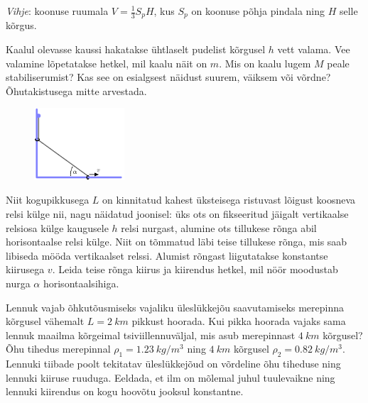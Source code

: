 \documentclass[10pt]{article}
\begin{document}
\textit{Vihje}: koonuse ruumala $V=\frac{1}{3}S_p H$, kus $S_p$ on koonuse põhja pindala ning $H$ selle kõrgus.
\probend
\bigskip


Kaalul olevasse kaussi hakatakse ühtlaselt pudelist kõrgusel $h$ vett valama. Vee valamine lõpetatakse hetkel, mil kaalu näit on $m$. Mis on kaalu lugem $M$ peale stabiliserumist? Kas see on esialgsest näidust suurem, väiksem või võrdne? Õhutakistusega mitte arvestada.
\probend
\bigskip


\begin{figure}
	\vspace{-13pt}
	\includegraphics[width=0.3\textwidth]{2019-lahg-07-yl.pdf}
\end{figure}

Niit kogupikkusega $L$ on kinnitatud kahest üksteisega ristuvast lõigust koosneva relsi külge nii, nagu näidatud joonisel: üks ots on fikseeritud jäigalt vertikaalse relsiosa külge kaugusele $h$ relsi nurgast, alumine ots tillukese rõnga abil horisontaalse relsi külge. Niit on tõmmatud läbi teise tillukese rõnga, mis saab libiseda mööda vertikaalset relssi. Alumist rõngast liigutatakse konstantse kiirusega $v$. Leida teise rõnga kiirus ja kiirendus hetkel, mil nöör moodustab nurga $\alpha$ horisontaalsihiga.
\probend
\bigskip

\setAuthor{}

Lennuk vajab õhkutõusmiseks vajaliku üleslükkejõu saavutamiseks merepinna kõrgusel vähemalt $L=\SI{2}{km}$ pikkust hoorada. Kui pikka hoorada vajaks sama lennuk maailma kõrgeimal tsiviillennuväljal, mis asub merepinnast $\SI{4}{km}$ kõrgusel? Õhu tihedus merepinnal $\rho_1 = \SI{1,23}{kg/m^3}$ ning $\SI{4}{km}$ kõrgusel $\rho_2 = \SI{0,82 }{kg/m^3}$. Lennuki tiibade poolt tekitatav üleslükkejõud on võrdeline õhu tiheduse ning lennuki kiiruse ruuduga. Eeldada, et ilm on mõlemal juhul tuulevaikne ning lennuki kiirendus on kogu hoovõtu jooksul konstantne.
\probend
\bigskip
\end{document}
